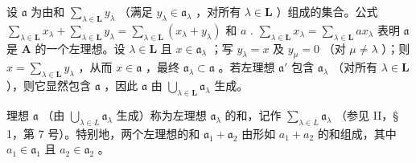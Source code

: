 设 \(\mathfrak{a}\) 为由和 \(\sum_{\lambda \in \mathbf{L}} y_{\lambda}\) （满足 \(y_{\lambda} \in \mathfrak{a}_{\lambda}\) ，对所有 \(\lambda \in \mathbf{L}\) ）组成的集合。公式 \(\sum_{\lambda \in \mathbf{L}} x_{\lambda} + \sum_{\lambda \in \mathbf{L}} y_{\lambda} = \sum_{\lambda \in \mathbf{L}} (x_{\lambda} + y_{\lambda})\) 和 \(a\) . \(\sum_{\lambda \in \mathbf{L}} x_{\lambda} = \sum_{\lambda \in \mathbf{L}} ax_{\lambda}\) 表明 \(\mathfrak{a}\) 是 \(\mathbf{A}\) 的一个左理想。设 \(\lambda \in \mathbf{L}\) 且 \(x \in \mathfrak{a}_{\lambda}\) ；写 \(y_{\lambda} = x\) 及 \(y_{\mu} = 0\) （对 \(\mu \neq \lambda\) ）；则 \(x = \sum_{\lambda \in \mathbf{L}} y_{\lambda}\) ，从而 \(x \in \mathfrak{a}\) ，最终 \(\mathfrak{a}_{\lambda} \subset \mathfrak{a}\) 。若左理想 \(\mathfrak{a}'\) 包含 \(\mathfrak{a}_{\lambda}\) （对所有 \(\lambda \in \mathbf{L}\) ），则它显然包含 \(\mathfrak{a}\) ，因此 \(\mathfrak{a}\) 由 \(\bigcup_{\lambda \in \mathbf{L}} \mathfrak{a}_{\lambda}\) 生成。

理想 \(\mathfrak{a}\) （由 \(\bigcup_{\lambda \in L} \mathfrak{a}_{\lambda}\) 生成）称为左理想 \(\mathfrak{a}_{\lambda}\) 的和，记作 \(\sum_{\lambda \in L} \mathfrak{a}_{\lambda}\) （参见 II，§ 1，第 7 号）。特别地，两个左理想的和 \(\mathfrak{a}_{1} + \mathfrak{a}_{2}\) 由形如 \(a_{1} + a_{2}\) 的和组成，其中 \(a_{1} \in \mathfrak{a}_{1}\) 且 \(a_{2} \in \mathfrak{a}_{2}\) 。

